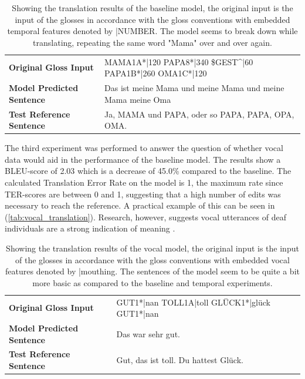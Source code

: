 \begin{table}[h]
\centering
\caption{Showing the translation results of the baseline model, the original input is the input of the glosses in accordance with the gloss conventions with embedded temporal features denoted by |NUMBER. The model seems to break down while translating, repeating the same word "Mama" over and over again.}

\begin{tabular}{ll}
\textbf{Original Gloss Input}     &MAMA1A*|120 PAPA8*|340 \$GEST\textasciicircum{}|60 PAPA1B*|260 OMA1C*|120  \\
\textbf{Model Predicted Sentence} & Das ist meine Mama und meine Mama und meine Mama meine Oma  \\     
\textbf{Test Reference Sentence}  & Ja, MAMA und PAPA, oder so PAPA, PAPA, OPA, OMA.              \\                       \bottomrule                                                    
\end{tabular}

\label{tab:temporal_translation}
\end{table}

The third experiment was performed to answer the question of whether vocal data would aid in the performance of the baseline model. The results show a BLEU-score of 2.03 which is a decrease of 45.0\% compared to the baseline. The calculated Translation Error Rate on the model is 1, the maximum rate since TER-scores are between 0 and 1, suggesting that a high number of edits was necessary to reach the reference. A practical example of this can be seen in (\autoref{tab:vocal_translation}). Research, however, suggests vocal utterances of deaf individuals are a strong indication of meaning \cite{kristoffersen2016designing}.

\begin{table}[h]
\centering
\caption{Showing the translation results of the vocal model, the original input is the input of the glosses in accordance with the gloss conventions with embedded vocal features denoted by |mouthing. The sentences of the model seem to be quite a bit more basic as compared to the baseline and temporal experiments.}

\begin{tabular}{ll}

\textbf{Original Gloss Input}     & GUT1*|nan TOLL1A|toll GLÜCK1*|glück GUT1*|nan \\
\textbf{Model Predicted Sentence} & Das war sehr gut.                                                                                     \\
\textbf{Test Reference Sentence}  & Gut, das ist toll. Du hattest Glück.        \\                                      
\bottomrule
\end{tabular}

\label{tab:vocal_translation}
\end{table}

